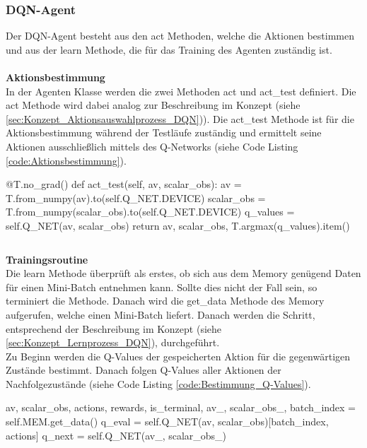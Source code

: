 \subsubsection{DQN-Agent} \label{sec:Implementierung_DQN_Agent}
Der DQN-Agent besteht aus den act Methoden, welche die Aktionen bestimmen und aus der learn Methode, die für das Training des Agenten zuständig ist.\\
\\\textbf{Aktionsbestimmung} \label{sec:Implementierung_act_DQN}\\
In der Agenten Klasse werden die zwei Methoden act und act\_test definiert. Die act Methode wird dabei analog zur Beschreibung im Konzept (siehe \ref{sec:Konzept_Aktionsauswahlprozess_DQN})).
Die act\_test Methode ist für die Aktionsbestimmung während der Testläufe zuständig und ermittelt seine Aktionen ausschließlich mittels des Q-Networks (siehe Code Listing \ref{code:Aktionsbestimmung}).
\begin{python}
@T.no_grad()
def act_test(self, av, scalar_obs):
	av = T.from_numpy(av).to(self.Q_NET.DEVICE)
	scalar_obs = T.from_numpy(scalar_obs).to(self.Q_NET.DEVICE)
	q_values = self.Q_NET(av, scalar_obs)
	return av, scalar_obs, T.argmax(q_values).item()
\end{python}
\begin{lstlisting}[caption=Aktionsbestimmung, label=code:Aktionsbestimmung]
\end{lstlisting}
\textbf{Trainingsroutine} \label{sec:Implementierung_learn_DQN}\\
Die learn Methode überprüft als erstes, ob sich aus dem Memory genügend Daten für einen Mini-Batch entnehmen kann. Sollte dies nicht der Fall sein, so terminiert die Methode.
Danach wird die get\_data Methode des Memory aufgerufen, welche einen Mini-Batch liefert. Danach werden die Schritt, entsprechend der Beschreibung im Konzept (siehe \ref{sec:Konzept_Lernprozess_DQN}), durchgeführt.\\
Zu Beginn werden die Q-Values der gespeicherten Aktion für die gegenwärtigen Zustände bestimmt. Danach folgen Q-Values aller Aktionen der Nachfolgezustände (siehe Code Listing \ref{code:Bestimmung_Q-Values}).
\begin{python}
av, scalar_obs, actions, rewards, is_terminal, av_, scalar_obs_, batch_index = self.MEM.get_data()
q_eval = self.Q_NET(av, scalar_obs)[batch_index, actions]
q_next = self.Q_NET(av_, scalar_obs_)
\end{python}
\begin{lstlisting}[caption=Bestimmung der Q-Values, label=code:Bestimmung_Q-Values]
\end{lstlisting}
